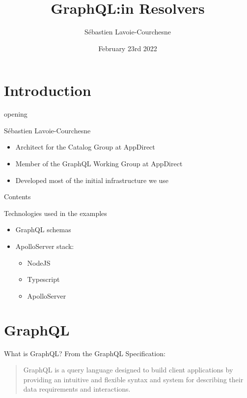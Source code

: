 \documentclass[notes]{beamer}
\title{GraphQL:\@Thinking in Resolvers}
\author{Sébastien Lavoie-Courchesne}
\date{February 23rd 2022}
\begin{document}
\begin{frame}
  \titlepage{}
\end{frame}

\section{Introduction}
\begin{frame}
  opening
\end{frame}


\begin{frame}{Sébastien Lavoie-Courchesne}
  \begin{itemize}
  \item Architect for the Catalog Group at AppDirect
  \item Member of the GraphQL Working Group at AppDirect
  \item Developed most of the initial infrastructure we use
  \end{itemize}
\end{frame}


\begin{frame}{Contents}
\end{frame}


\begin{frame}{Technologies used in the examples}
  \begin{itemize}
  \item GraphQL schemas
  \item ApolloServer stack:
    \begin{itemize}
    \item NodeJS
    \item Typescript
    \item ApolloServer
    \end{itemize}
  \end{itemize}
\end{frame}


\section{GraphQL}
\begin{frame}{What is GraphQL?}
  From the GraphQL Specification\cite{graphql-spec}:
  \begin{quote}
    GraphQL is a query language designed to build client applications by providing an intuitive and flexible syntax and system for describing their data requirements and interactions.
  \end{quote}
\end{frame}
\end{document}
